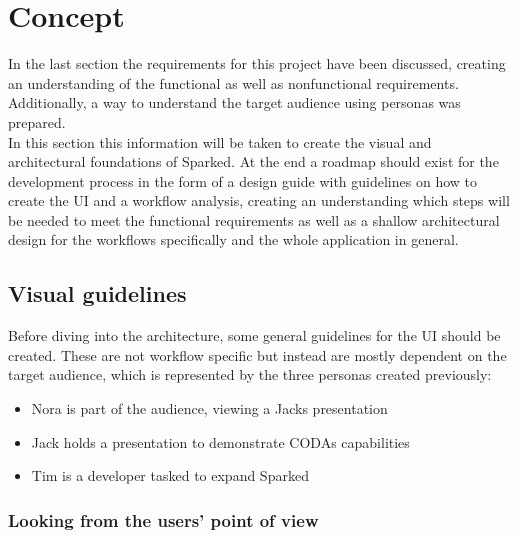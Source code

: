\chapter{Concept}


In the last section the requirements for this project have been discussed, creating an understanding of the functional as well as nonfunctional requirements. Additionally, a way to understand the target audience using personas was prepared. \\
In this section this information will be taken to create the visual and architectural foundations of Sparked. At the end a roadmap should exist for the development process in the form of a design guide with guidelines on how to create the UI and a workflow analysis, creating an understanding which steps will be needed to meet the functional requirements as well as a shallow architectural design for the workflows specifically and the whole application in general.
\section{Visual guidelines}
Before diving into the architecture, some general guidelines for the UI should be created. These are not workflow specific but instead are mostly dependent on the target audience, which is represented by the three personas created previously: 

\begin{itemize}
\item Nora is part of the audience, viewing a Jacks presentation
\item Jack holds a presentation to demonstrate CODAs capabilities
\item Tim is a developer tasked to expand Sparked
\end{itemize}

\subsection{Looking from the users’ point of view}

